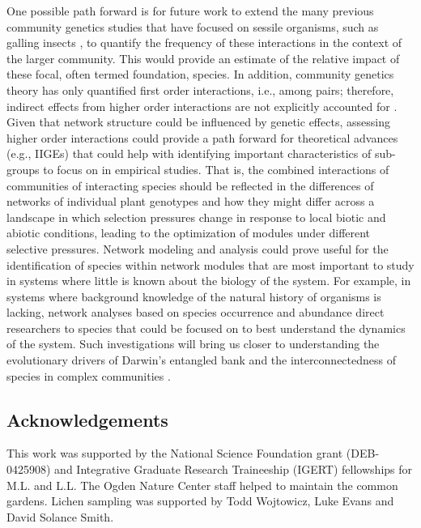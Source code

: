 \documentclass[fleqn,12pt]{olplainarticle}
\begin{document}
One possible path forward is for future work to extend the many
previous community genetics studies that have focused on sessile
organisms, such as galling insects
\citep{Bailey2005ImportanceInteractions, Whitham2006a, Crutsinger2014,
  Smith2011, Keith2017}, to quantify the frequency of these
interactions in the context of the larger community. This would
provide an estimate of the relative impact of these focal, often
termed foundation, species. In addition, community genetics theory has
only quantified first order interactions, i.e., among pairs;
therefore, indirect effects from higher order interactions are not
explicitly accounted for \citep{Shuster2006COMMUNITYSTRUCTURE,
  Whitham2012, Whitham2020IntraspecificEvolution}. Given that network
structure could be influenced by genetic effects, assessing higher
order interactions could provide a path forward for theoretical
advances (e.g., IIGEs) that could help with identifying important
characteristics of sub-groups to focus on in empirical studies. That
is, the combined interactions of communities of interacting species
should be reflected in the differences of networks of individual plant
genotypes and how they might differ across a landscape in which
selection pressures change in response to local biotic and abiotic
conditions, leading to the optimization of modules under different
selective pressures. Network modeling and analysis could prove useful
for the identification of species within network modules that are most
important to study in systems where little is known about the biology
of the system. For example, in systems where background knowledge of
the natural history of organisms is lacking, network analyses based on
species occurrence and abundance direct researchers to species that
could be focused on to best understand the dynamics of the
system. Such investigations will bring us closer to understanding the
evolutionary drivers of Darwin's entangled bank and the
interconnectedness of species in complex communities
\citep{Darwin1859, Dattilo2016fix}.


\subsection*{Acknowledgements}

This work was supported by the National Science Foundation grant
(DEB-0425908) and Integrative Graduate Research Traineeship (IGERT)
fellowships for M.L. and L.L. The Ogden Nature Center staff helped to
maintain the common gardens. Lichen sampling was supported by Todd
Wojtowicz, Luke Evans and David Solance Smith.
\end{document}
